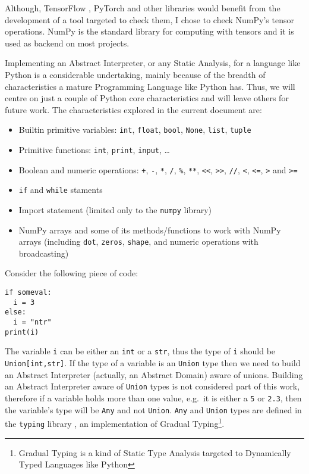Although, TensorFlow \autocite{abadi_tensorflow_2016}, PyTorch
\autocite{paszke2017pytorch} and other libraries would benefit from the
development of a tool targeted to check them, I chose to check NumPy's
tensor operations. NumPy is the standard library for computing with
tensors and it is used as backend on most projects.

Implementing an Abstract Interpreter, or any Static Analysis, for a
language like Python is a considerable undertaking, mainly because of
the breadth of characteristics a mature Programming Language like Python
has. Thus, we will centre on just a couple of Python core
characteristics and will leave others for future work. The
characteristics explored in the current document are:

\begin{itemize}
\tightlist
\item
  Builtin primitive variables: \texttt{int}, \texttt{float},
  \texttt{bool}, \texttt{None}, \texttt{list}, \texttt{tuple}
\item
  Primitive functions: \texttt{int}, \texttt{print}, \texttt{input},
  \ldots{}
\item
  Boolean and numeric operations: \texttt{+}, \texttt{-}, \texttt{*},
  \texttt{/}, \texttt{\%}, \texttt{**}, \texttt{\textless{}\textless{}},
  \texttt{\textgreater{}\textgreater{}}, \texttt{//},
  \texttt{\textless{}}, \texttt{\textless{}=}, \texttt{\textgreater{}}
  and \texttt{\textgreater{}=}
\item
  \texttt{if} and \texttt{while} staments
\item
  Import statement (limited only to the \texttt{numpy} library)
\item
  NumPy arrays and some of its methods/functions to work with NumPy
  arrays (including \texttt{dot}, \texttt{zeros}, \texttt{shape}, and
  numeric operations with broadcasting)
\end{itemize}

Consider the following piece of code:

\begin{verbatim}
if someval:
  i = 3
else:
  i = "ntr"
print(i)
\end{verbatim}

The variable \texttt{i} can be either an \texttt{int} or a \texttt{str},
thus the type of \texttt{i} should be \texttt{Union{[}int,str{]}}. If
the type of a variable is an \texttt{Union} type then we need to build
an Abstract Interpreter (actually, an Abstract Domain) aware of unions.
Building an Abstract Interpreter aware of \texttt{Union} types is not
considered part of this work, therefore if a variable holds more than
one value, e.g.~it is either a \texttt{5} or \texttt{2.3}, then the
variable's type will be \texttt{Any} and not \texttt{Union}.
\texttt{Any} and \texttt{Union} types are defined in the \texttt{typing}
library \autocite{pep484}, an implementation of Gradual Typing\footnote{Gradual
  Typing is a kind of Static Type Analysis targeted to Dynamically Typed
  Languages like Python}.

